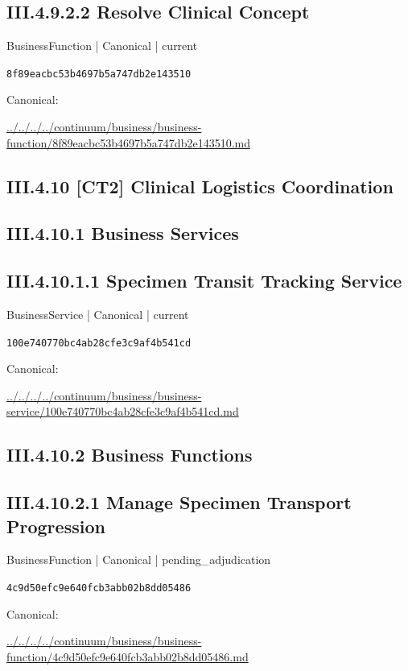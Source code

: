 \documentclass[10pt,a4paper]{article}
\begin{document}
\subsection*{III.4.9.2.2 Resolve Clinical Concept}
{\small BusinessFunction | Canonical | current}\par
\texttt{8f89eacbc53b4697b5a747db2e143510}\par
Canonical: \par
{\footnotesize\url{../../../../continuum/business/business-function/8f89eacbc53b4697b5a747db2e143510.md}}\par
\subsection*{III.4.10 [CT2] Clinical Logistics Coordination}
\subsection*{III.4.10.1 Business Services}
\subsection*{III.4.10.1.1 Specimen Transit Tracking Service}
{\small BusinessService | Canonical | current}\par
\texttt{100e740770bc4ab28cfe3c9af4b541cd}\par
Canonical: \par
{\footnotesize\url{../../../../continuum/business/business-service/100e740770bc4ab28cfe3c9af4b541cd.md}}\par
\subsection*{III.4.10.2 Business Functions}
\subsection*{III.4.10.2.1 Manage Specimen Transport Progression}
{\small BusinessFunction | Canonical | pending\_adjudication}\par
\texttt{4c9d50efc9e640fcb3abb02b8dd05486}\par
Canonical: \par
{\footnotesize\url{../../../../continuum/business/business-function/4c9d50efc9e640fcb3abb02b8dd05486.md}}\par
\end{document}
